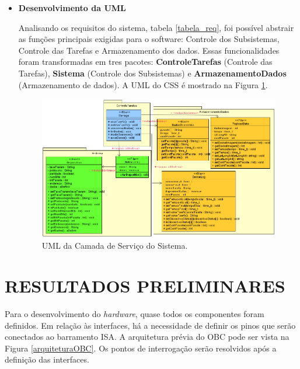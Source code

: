 \begin{itemize}
\item \textbf{Desenvolvimento da UML}

Analisando os requisitos do sistema, tabela \ref{tabela_req}, foi possível abstrair as funções principais exigidas para o software: Controle dos Subsistemas, Controle das Tarefas e  Armazenamento dos dados. Essas funcionalidades foram transformadas em tres pacotes: \textbf{ControleTarefas} (Controle das Tarefas), \textbf{Sistema} (Controle dos Subsistemas) e \textbf{ArmazenamentoDados} (Armazenamento de dados). A UML do CSS é mostrado na Figura \ref{uml_CSS}.


\begin{figure}[h]
	\centering
\includegraphics[keepaspectratio=true,scale=0.72]{figuras/CSS.png}
	\caption{UML da Camada de Serviço do Sistema.}
	\label{uml_CSS}
\end{figure}

\end{itemize}

\chapter[RESULTADOS PRELIMINARES]{RESULTADOS PRELIMINARES}

Para o desenvolvimento do \textit{hardware}, quase todos os componentes foram definidos. Em relação às interfaces, há a necessidade de definir os pinos que serão conectados ao barramento ISA. A arquitetura prévia do OBC pode ser vista na Figura \ref{arquiteturaOBC}. Os pontos de interrogação serão resolvidos após a definição das interfaces.

